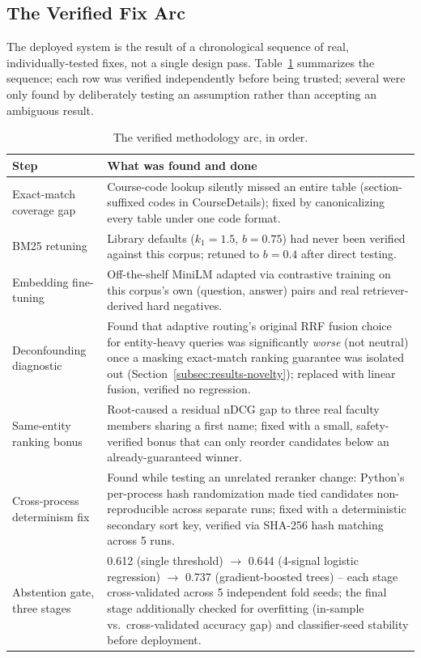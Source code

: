\documentclass[a4paper,twoside]{article}
\begin{document}
\subsection{The Verified Fix Arc}
\label{subsec:process-arc}

The deployed system is the result of a chronological sequence of real, individually-tested fixes, not a single design pass. Table~\ref{tab:fix-arc} summarizes the sequence; each row was verified independently before being trusted; several were only found by deliberately testing an assumption rather than accepting an ambiguous result.

\begin{table}[h]
\caption{The verified methodology arc, in order.}\label{tab:fix-arc}\centering
\begin{tabular}{|p{3.1cm}|p{7.6cm}|}
\hline
Step & What was found and done \\
\hline
Exact-match coverage gap & Course-code lookup silently missed an entire table (section-suffixed codes in CourseDetails); fixed by canonicalizing every table under one code format. \\
BM25 retuning & Library defaults ($k_1=1.5$, $b=0.75$) had never been verified against this corpus; retuned to $b=0.4$ after direct testing. \\
Embedding fine-tuning & Off-the-shelf MiniLM adapted via contrastive training on this corpus's own (question, answer) pairs and real retriever-derived hard negatives. \\
Deconfounding diagnostic & Found that adaptive routing's original RRF fusion choice for entity-heavy queries was significantly \emph{worse} (not neutral) once a masking exact-match ranking guarantee was isolated out (Section~\ref{subsec:results-novelty}); replaced with linear fusion, verified no regression. \\
Same-entity ranking bonus & Root-caused a residual nDCG gap to three real faculty members sharing a first name; fixed with a small, safety-verified bonus that can only reorder candidates below an already-guaranteed winner. \\
Cross-process determinism fix & Found while testing an unrelated reranker change: Python's per-process hash randomization made tied candidates non-reproducible across separate runs; fixed with a deterministic secondary sort key, verified via SHA-256 hash matching across 5 runs. \\
Abstention gate, three stages & 0.612 (single threshold) $\to$ 0.644 (4-signal logistic regression) $\to$ 0.737 (gradient-boosted trees) -- each stage cross-validated across 5 independent fold seeds; the final stage additionally checked for overfitting (in-sample vs.\ cross-validated accuracy gap) and classifier-seed stability before deployment. \\

\end{tabular}
\end{table}
\end{document}

